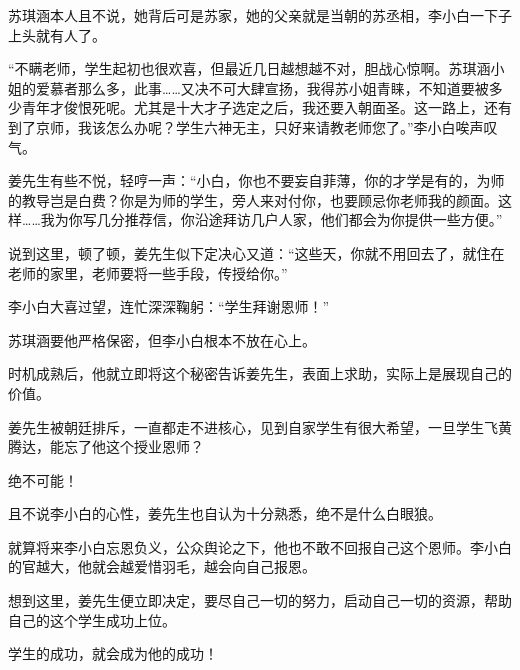 \begin{this_body}
苏琪涵本人且不说，她背后可是苏家，她的父亲就是当朝的苏丞相，李小白一下子上头就有人了。

“不瞒老师，学生起初也很欢喜，但最近几日越想越不对，胆战心惊啊。苏琪涵小姐的爱慕者那么多，此事……又决不可大肆宣扬，我得苏小姐青睐，不知道要被多少青年才俊恨死呢。尤其是十大才子选定之后，我还要入朝面圣。这一路上，还有到了京师，我该怎么办呢？学生六神无主，只好来请教老师您了。”李小白唉声叹气。

姜先生有些不悦，轻哼一声：“小白，你也不要妄自菲薄，你的才学是有的，为师的教导岂是白费？你是为师的学生，旁人来对付你，也要顾忌你老师我的颜面。这样……我为你写几分推荐信，你沿途拜访几户人家，他们都会为你提供一些方便。”

说到这里，顿了顿，姜先生似下定决心又道：“这些天，你就不用回去了，就住在老师的家里，老师要将一些手段，传授给你。”

李小白大喜过望，连忙深深鞠躬：“学生拜谢恩师！”

苏琪涵要他严格保密，但李小白根本不放在心上。

时机成熟后，他就立即将这个秘密告诉姜先生，表面上求助，实际上是展现自己的价值。

姜先生被朝廷排斥，一直都走不进核心，见到自家学生有很大希望，一旦学生飞黄腾达，能忘了他这个授业恩师？

绝不可能！

且不说李小白的心性，姜先生也自认为十分熟悉，绝不是什么白眼狼。

就算将来李小白忘恩负义，公众舆论之下，他也不敢不回报自己这个恩师。李小白的官越大，他就会越爱惜羽毛，越会向自己报恩。

想到这里，姜先生便立即决定，要尽自己一切的努力，启动自己一切的资源，帮助自己的这个学生成功上位。

学生的成功，就会成为他的成功！

\end{this_body}

